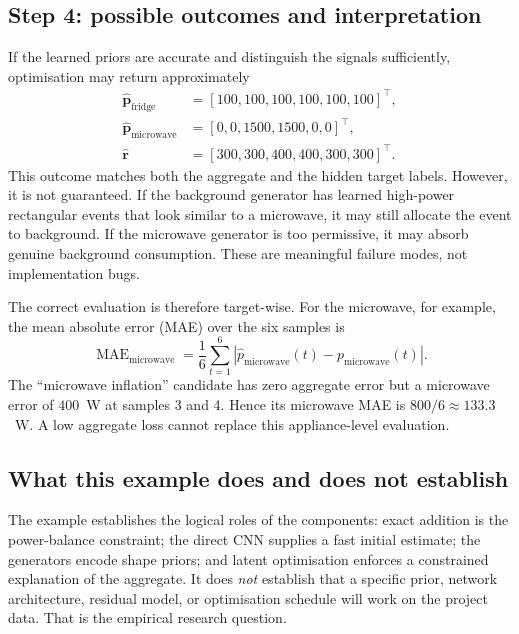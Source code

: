 \documentclass[11pt]{article}
\newcommand{\vect}[1]{\mathbf{#1}}
\begin{document}
\subsection{Step 4: possible outcomes and interpretation}

If the learned priors are accurate and distinguish the signals sufficiently, optimisation may return approximately
\begin{align}
    \hat{\vect{p}}_{\mathrm{fridge}}&=[100,100,100,100,100,100]^{\top},\\
    \hat{\vect{p}}_{\mathrm{microwave}}&=[0,0,1500,1500,0,0]^{\top},\\
    \hat{\vect{r}}&=[300,300,400,400,300,300]^{\top}.
    \label{eq:desired_example_solution}
\end{align}
This outcome matches both the aggregate and the hidden target labels. However, it is not guaranteed. If the background generator has learned high-power rectangular events that look similar to a microwave, it may still allocate the event to background. If the microwave generator is too permissive, it may absorb genuine background consumption. These are meaningful failure modes, not implementation bugs.

The correct evaluation is therefore target-wise. For the microwave, for example, the mean absolute error (MAE) over the six samples is
\begin{equation}
    \operatorname{MAE}_{\mathrm{microwave}}=
    \frac{1}{6}\sum_{t=1}^{6}
    \left|\hat p_{\mathrm{microwave}}(t)-p_{\mathrm{microwave}}(t)\right|.
    \label{eq:example_mae}
\end{equation}
The ``microwave inflation'' candidate has zero aggregate error but a microwave error of $400$~W at samples 3 and 4. Hence its microwave MAE is $800/6\approx133.3$~W. A low aggregate loss cannot replace this appliance-level evaluation.

\subsection{What this example does and does not establish}

The example establishes the logical roles of the components: exact addition is the power-balance constraint; the direct CNN supplies a fast initial estimate; the generators encode shape priors; and latent optimisation enforces a constrained explanation of the aggregate. It does \emph{not} establish that a specific prior, network architecture, residual model, or optimisation schedule will work on the project data. That is the empirical research question.
\end{document}

